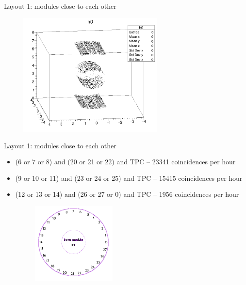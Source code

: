 \documentclass{beamer}
\begin{document}
\begin{frame}{Layout 1: modules close to each other}
\begin{figure}
\includegraphics[width=0.65\textwidth]{images/close.png}
\end{figure}
\end{frame}

\begin{frame}{Layout 1: modules close to each other}
\begin{itemize}
\item (6 or 7 or 8) and (20 or 21 or 22) and TPC -- 23341 coincidences per hour
\item (9 or 10 or 11) and (23 or 24 or 25) and TPC -- 15415 coincidences per hour
\item (12 or 13 or 14) and (26 or 27 or 0) and TPC -- 1956 coincidences per hour
\begin{figure}
\includegraphics[width=0.4\textwidth]{images/nocoin.png}
\end{figure}
\end{itemize}
\end{frame}
\end{document}
